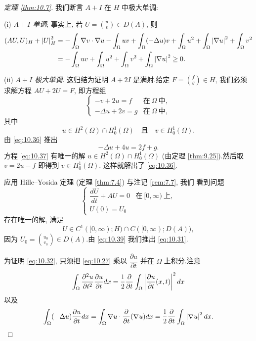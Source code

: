 \begin{proof}[定理 \ref{thm:10.7}]
我们断言 $A+I$ 在 $H$ 中极大单调:

(i) \emph{$A+I$ 单调}; 事实上, 若 $U=\binom{u}{v}\in D(A)$, 则
\begin{align*}
(AU,U)_H+\left|U\right|^2_H
&=-\int_\Omega\nabla v\cdot\nabla u-\int_\Omega uv
+\int_\Omega(-\Delta u)v+\int_\Omega u^2+\int_\Omega\left|\nabla u\right|^2
+\int_\Omega v^2\\
&=-\int_\Omega uv+\int_\Omega u^2+\int_\Omega v^2+\int_\Omega\left|\nabla u\right|^2
\ge0.
\end{align*}

(ii) \emph{$A+I$ 极大单调.} 这归结为证明 $A+2I$ 是满射.给定
$F=\binom{f}{g}\in H$, 我们必须求解方程 $AU+2U=F$, 即方程组
\begin{equation}
\begin{cases}
-v+2u=f & \text{在}\ \Omega\ \text{中},\\
-\Delta u+2v=g & \text{在}\ \Omega\ \text{中},
\end{cases}
\label{eq:10.36}
\end{equation}
其中
\begin{equation*}
u\in H^2(\Omega)\cap H_0^1(\Omega)\quad\text{且}\quad
v\in H_0^1(\Omega).
\end{equation*}
由 \eqref{eq:10.36} 推出
\begin{equation}
-\Delta u+4u=2f+g.
\label{eq:10.37}
\end{equation}
方程 \eqref{eq:10.37} 有唯一的解 $u\in H^2(\Omega)\cap H_0^1(\Omega)$
(由定理  \ref{thm:9.25}).然后取 $v=2u-f$ 即得到 $v\in H_0^1(\Omega)$.
这样就解出了 \eqref{eq:10.36}.

应用 Hille--Yosida 定理 (定理  \ref{thm:7.4}) 与注记 \ref{rem:7.7}, 我们
看到问题
\begin{equation}
\begin{cases}
\dfrac{dU}{dt}+AU=0 & \text{在}\ [0,\infty)\ \text{上},\\
U(0)=U_0
\end{cases}
\label{eq:10.38}
\end{equation}
存在唯一的解, 满足
\begin{equation}
U\in C^1([0,\infty);H)\cap C([0,\infty);D(A)),
\label{eq:10.39}
\end{equation}
因为 $U_0=\binom{u_0}{v_0}\in D(A)$.由 \eqref{eq:10.39} 我们推出
\eqref{eq:10.31}.

为证明 \eqref{eq:10.32}, 只须把 \eqref{eq:10.27} 乘以
$\dfrac{\partial u}{\partial t}$ 并在 $\Omega$ 上积分.注意
\begin{equation*}
\int_\Omega\frac{\partial^2u}{\partial t^2}
\frac{\partial u}{\partial t}dx
=\frac12\frac{\partial}{\partial t}\int_\Omega
\left|\frac{\partial u}{\partial t}(x,t)\right|^2dx
\end{equation*}
以及
\begin{equation*}
\int_\Omega(-\Delta u)\frac{\partial u}{\partial t}dx
=\int_\Omega\nabla u\cdot\frac{\partial}{\partial t}(\nabla u)dx
=\frac12\frac{\partial}{\partial t}\int_\Omega\left|\nabla u\right|^2dx.
\end{equation*}
\end{proof}

